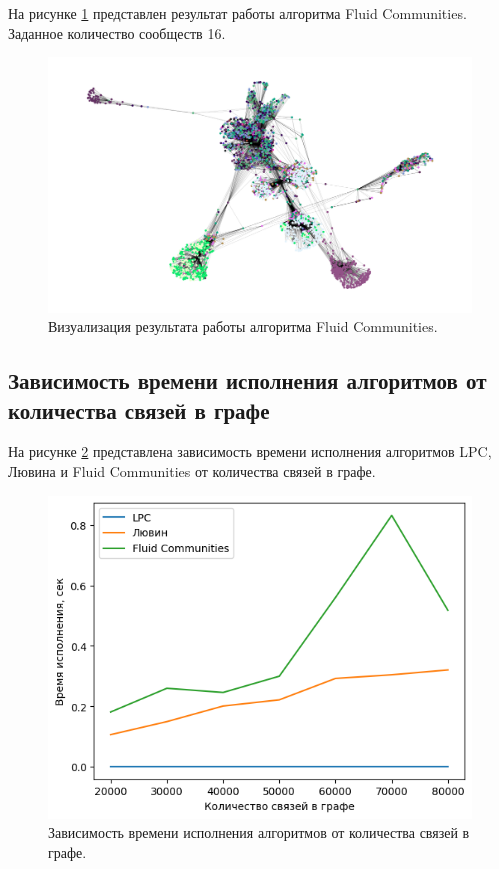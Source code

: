 На рисунке \ref{img:7} представлен результат работы алгоритма Fluid Communities. Заданное количество сообществ 16.


\begin{figure}[H]
	\centering
	\includegraphics[width=\textwidth]{inc/7.png}
	\caption{ Визуализация результата работы алгоритма Fluid Communities.}
	\label{img:7}
\end{figure}

\subsection{Зависимость времени исполнения алгоритмов от количества связей в графе}

На рисунке \ref{img:8} представлена зависимость времени исполнения алгоритмов LPC, Лювина и Fluid Communities от количества связей в графе.

\begin{figure}[H]
	\centering
	\includegraphics[width=\textwidth]{inc/8.png}
	\caption{ Зависимость времени исполнения алгоритмов от количества связей в графе.}
	\label{img:8}
\end{figure}

